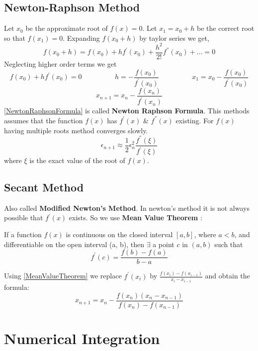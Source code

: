 \documentclass[a4paper,oneside]{book}
\begin{document}
\section{Newton-Raphson Method}
Let $x_0$ be the approximate root of $f(x) = 0$. Let $x_1 = x_0 + h$ be the correct root so that $f(x_1) = 0$. Expanding $f(x_0 + h)$ by taylor series we get,
$$f(x_0 + h) = f(x_0) + hf^{'}(x_0) + \frac{h^2}{2!}f^{''}(x_0) + \ldots = 0$$ 
Neglecting higher order terms we get $$f(x_0) + hf^{'}(x_0)  = 0 \hspace{2cm} h = -\frac{f(x_0)}{f^{'}(x_0)} \hspace{2cm}
x_1 = x_0 - \frac{f(x_0)}{f^{'}(x_0)}$$
\begin{equation}
x_{n+1} = x_{n} - \frac{f(x_n)}{f^{'}(x_n)}
\label{NewtonRaphsonFormula}
\end{equation}
\ref{NewtonRaphsonFormula} is called \textbf{Newton Raphson Formula}. This methods assumes that the function $f(x)$ has $f^{'}(x)$ \& $f^{''}(x)$ existing. For $f(x)$ having multiple roots method converges slowly.
\begin{equation}
\epsilon_{n+1} \approx \frac{1}{2}\epsilon_{n}^{2}\frac{f^{''}(\xi)}{f^{'}(\xi)}
\label{ErrorNRF}
\end{equation}
where $\xi$ is the exact value of the root of $f(x)$.
\section{Secant Method}
Also called \textbf{Modified Newton's Method}. In newton's method it is not always possible that $f^{'}(x)$ exists. So we use \textbf{Mean Value Theorem} :
\begin{theorem}
If a function $f(x)$ is continuous on the closed interval $[a, b]$, where $a < b$, and differentiable on the open interval (a, b), then $\exists$ a point $c$ in $(a, b)$ such that
$$ f^{'}(c) = \frac{f(b) - f(a)}{b - a}$$
\label{MeanValueTheorem}
\end{theorem}
Using \ref{MeanValueTheorem} we replace $f^{'}(x_i)$ by $\frac{f(x_i) - f(x_{i-1})}{x_i - x_{i-1}}$ and obtain the formula:
\begin{equation}
x_{n+1} = x_{n} - \frac{f(x_n)(x_n - x_{n-1})}{f(x_n) - f(x_{n-1})}
\label{SecantMethod}
\end{equation}
\chapter{Numerical Integration}
\end{document}
